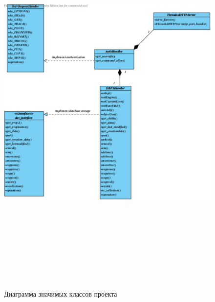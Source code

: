 \documentclass[utf8,usehyperref,12pt]{G7-32}
\begin{document}
\begin{figure}[h]
   \centering%
   \includegraphics[height=200mm, width=1\textwidth, clip, keepaspectratio]{pictures/davstorage}
   \caption{Диаграмма значимых классов проекта}\label{fig:appendix_davstorage}
 \end{figure}
\end{document}
